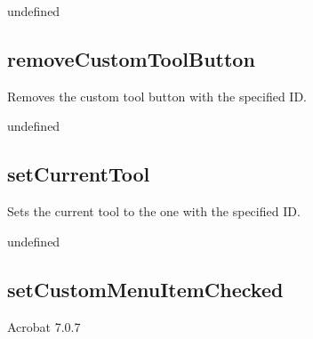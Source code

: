 \documentclass[letterpaper,12pt,english,openany,oneside]{sphinxmanual}
\begin{document}
\label{\detokenize{JS_3D_API:section-96}}\label{\detokenize{JS_3D_API:returns-95}}

undefined


\subsection{removeCustomToolButton}
\label{\detokenize{JS_3D_API:removecustomtoolbutton}}
Removes the custom tool button with the specified ID.

\label{\detokenize{JS_3D_API:syntax-95}}

\begin{sphinxVerbatim}[commandchars=\\\{\}]
\end{sphinxVerbatim}
\label{\detokenize{JS_3D_API:parameters-69}}

\label{\detokenize{JS_3D_API:section-97}}\label{\detokenize{JS_3D_API:returns-96}}

undefined


\subsection{setCurrentTool}
\label{\detokenize{JS_3D_API:setcurrenttool}}
Sets the current tool to the one with the specified ID.

\label{\detokenize{JS_3D_API:syntax-96}}

\begin{sphinxVerbatim}[commandchars=\\\{\}]
\end{sphinxVerbatim}
\label{\detokenize{JS_3D_API:parameters-70}}

\label{\detokenize{JS_3D_API:section-98}}\label{\detokenize{JS_3D_API:returns-97}}

undefined


\subsection{setCustomMenuItemChecked}
\label{\detokenize{JS_3D_API:setcustommenuitemchecked}}
Acrobat 7.0.7
\end{document}
